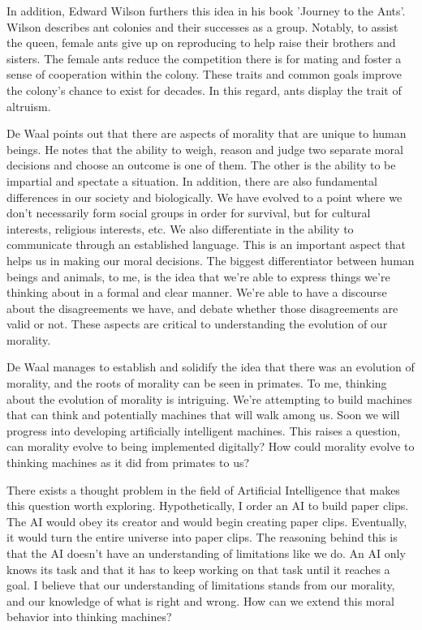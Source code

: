 \documentclass[11pt, oneside]{article}
\begin{document}
\par In addition, Edward Wilson furthers this idea in his book 'Journey to the Ants'. Wilson describes ant colonies and their successes as a group. Notably, to assist the queen, female ants give up on reproducing to help raise their brothers and sisters. The female ants reduce the competition there is for mating and foster a sense of cooperation within the colony. These traits and common goals improve the colony's chance to exist for decades. In this regard, ants display the trait of altruism.
 
\par De Waal points out that there are aspects of morality that are unique to human beings. He notes that the ability to weigh, reason and judge two separate moral decisions and choose an outcome is one of them. The other is the ability to be impartial and spectate a situation. In addition, there are also fundamental differences in our society and biologically. We have evolved to a point where we don't necessarily form social groups in order for survival, but for cultural interests, religious interests, etc. We also differentiate in the ability to communicate through an established language. This is an important aspect that helps us in making our moral decisions. The biggest differentiator between human beings and animals, to me, is the idea that we're able to express things we're thinking about in a formal and clear manner. We're able to have a discourse about the disagreements we have, and debate whether those disagreements are valid or not. These aspects are critical to understanding the evolution of our morality.
 
\par De Waal manages to establish and solidify the idea that there was an evolution of morality, and the roots of morality can be seen in primates. To me, thinking about the evolution of morality is intriguing. We're attempting to build machines that can think and potentially machines that will walk among us. Soon we will progress into developing artificially intelligent machines. This raises a question, can morality evolve to being implemented digitally? How could morality evolve to thinking machines as it did from primates to us?
 
\par There exists a thought problem in the field of Artificial Intelligence that makes this question worth exploring. Hypothetically, I order an AI to build paper clips. The AI would obey its creator and would begin creating paper clips. Eventually, it would turn the entire universe into paper clips. The reasoning behind this is that the AI doesn't have an understanding of limitations like we do. An AI only knows its task and that it has to keep working on that task until it reaches a goal. I believe that our understanding of limitations stands from our morality, and our knowledge of what is right and wrong. How can we extend this moral behavior into thinking machines?
 
\end{document}
